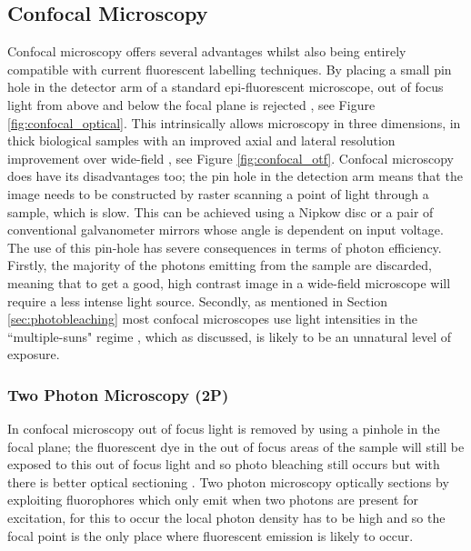 \subsection{Confocal Microscopy}

Confocal microscopy offers several advantages whilst also being entirely compatible with current fluorescent labelling techniques. By placing a small pin hole in the detector arm of a standard epi-fluorescent microscope, out of focus light from above and below the focal plane is rejected \cite{Minsky1957}, see Figure \ref{fig:confocal_optical}. This intrinsically allows microscopy in three dimensions, in thick biological samples with an improved axial and lateral resolution improvement over wide-field \cite{Claxton2006}, see Figure \ref{fig:confocal_otf}. Confocal microscopy does have its disadvantages too; the pin hole in the detection arm means that the image needs to be constructed by raster scanning a point of light through a sample, which is slow. This can be achieved using a Nipkow disc or a pair of conventional galvanometer mirrors whose angle is dependent on input voltage. The use of this pin-hole has severe consequences in terms of photon efficiency. Firstly, the majority of the photons emitting from the sample are discarded, meaning that to get a good, high contrast image in a wide-field microscope will require a less intense light source. Secondly, as mentioned in Section \ref{sec:photobleaching} most confocal microscopes use light intensities in the ``multiple-suns" regime \cite{Stelzer2015}, which as discussed, is likely to be an unnatural level of exposure.

\subsubsection{Two Photon Microscopy (2P)}
In confocal microscopy out of focus light is removed by using a pinhole in the focal plane; the fluorescent dye in the out of focus areas of the sample will still be exposed to this out of focus light and so photo bleaching still occurs but with there is better optical sectioning \cite{Helmchen2005}. Two photon microscopy optically sections by exploiting fluorophores which only emit when two photons are present for excitation, for this to occur the local photon density has to be high and so the focal point is the only place where fluorescent emission is likely to occur.

